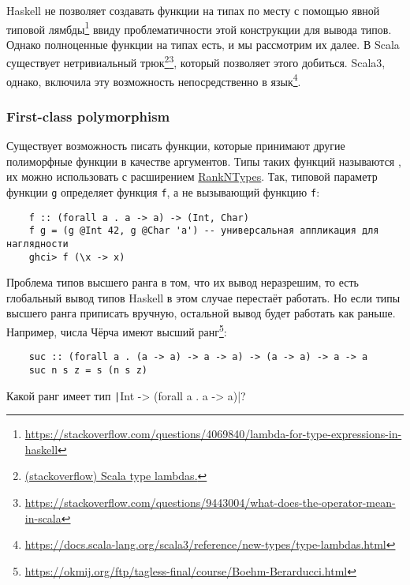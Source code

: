 Haskell не позволяет создавать функции на типах по месту с помощью явной типовой лямбды\footnote{\url{https://stackoverflow.com/questions/4069840/lambda-for-type-expressions-in-haskell}} ввиду проблематичности этой конструкции для вывода типов. %
Однако полноценные функции на типах есть, и мы рассмотрим их далее. %
В Scala существует нетривиальный трюк\footnote{\href{https://stackoverflow.com/questions/8736164/what-are-type-lambdas-in-scala-and-what-are-their-benefits}{(stackoverflow) Scala type lambdas.}}\footnote{\url{https://stackoverflow.com/questions/9443004/what-does-the-operator-mean-in-scala}}, который позволяет этого добиться.
Scala3, однако, включила эту возможность непосредственно в язык\footnote{\url{https://docs.scala-lang.org/scala3/reference/new-types/type-lambdas.html}}.

\subsubsection{First-class polymorphism}

Существует возможность писать функции, которые принимают другие полиморфные функции в качестве аргументов.
Типы таких функций называются , их можно использовать с расширением \href{https://downloads.haskell.org/ghc/latest/docs/users_guide/exts/rank_polymorphism.html}{RankNTypes}.
Так, типовой параметр функции \texttt{g} определяет функция \texttt{f}, а не вызывающий функцию \texttt{f}:
\begin{verbatim}
    f :: (forall a . a -> a) -> (Int, Char)
    f g = (g @Int 42, g @Char 'a') -- универсальная аппликация для наглядности
    ghci> f (\x -> x)
\end{verbatim}

Проблема типов высшего ранга в том, что их вывод неразрешим, то есть глобальный вывод типов Haskell в этом случае перестаёт работать.
Но если типы высшего ранга приписать вручную, остальной вывод будет работать как раньше.
Например, числа Чёрча имеют высший ранг\footnote{\url{https://okmij.org/ftp/tagless-final/course/Boehm-Berarducci.html}}:
\begin{verbatim}
    suc :: (forall a . (a -> a) -> a -> a) -> (a -> a) -> a -> a
    suc n s z = s (n s z)
\end{verbatim}

\begin{task}
    Какой ранг имеет тип \texttt|Int -> (forall a . a -> a)|?
\end{task}

